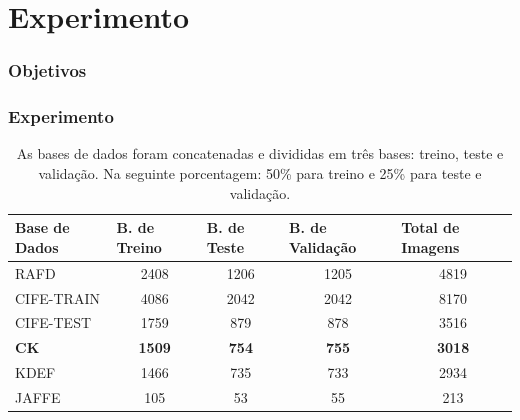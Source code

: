 \documentclass{beamer}
\begin{document}
\section{Experimento}

\begin{frame}
 \frametitle{Objetivos}
\end{frame}



\begin{frame}
\frametitle{Experimento}
\begin{table}
\tiny
\centering
\caption{As bases de dados foram concatenadas e divididas em três bases: treino, teste e validação. Na seguinte porcentagem: 50\% para treino e 25\% para teste e validação. }
\label{table:basesdivisao}
\begin{tabular}{lcccc}
\hline
\textbf{Base de Dados} & \multicolumn{1}{l}{\textbf{B. de Treino}} & \multicolumn{1}{l}{\textbf{B. de Teste}} & \multicolumn{1}{l}{\textbf{B. de Validação}} & \multicolumn{1}{l}{\textbf{Total de Imagens}} \\ \hline
RAFD                   & 2408                                        & 1206                                       & 1205                                           & 4819                                          \\
CIFE-TRAIN             & 4086                                        & 2042                                       & 2042                                           & 8170                                          \\
CIFE-TEST              & 1759                                        & 879                                        & 878                                            & 3516                                          \\
\textbf{CK}                     & \textbf{1509}                                        & \textbf{754}                                        & \textbf{755}                                            & \textbf{3018}                                          \\
KDEF                   & 1466                                        & 735                                        & 733                                            & 2934                                          \\
JAFFE                  & 105                                         & 53                                         & 55                                             & 213                                           \\

\end{tabular}
\end{table}
\end{frame}
\end{document}
